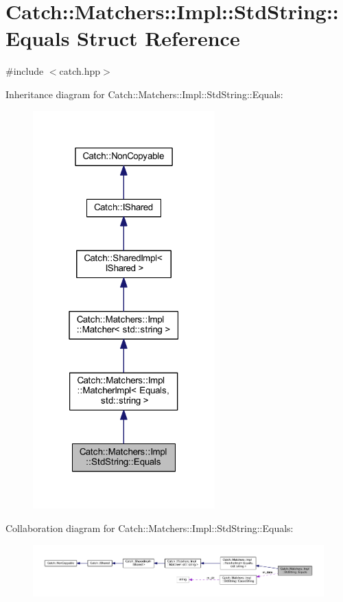 \hypertarget{struct_catch_1_1_matchers_1_1_impl_1_1_std_string_1_1_equals}{}\section{Catch\+:\+:Matchers\+:\+:Impl\+:\+:Std\+String\+:\+:Equals Struct Reference}
\label{struct_catch_1_1_matchers_1_1_impl_1_1_std_string_1_1_equals}


{\ttfamily \#include $<$catch.\+hpp$>$}



Inheritance diagram for Catch\+:\+:Matchers\+:\+:Impl\+:\+:Std\+String\+:\+:Equals\+:\nopagebreak
\begin{figure}[H]
\begin{center}
\leavevmode
\includegraphics[width=199pt]{struct_catch_1_1_matchers_1_1_impl_1_1_std_string_1_1_equals__inherit__graph}
\end{center}
\end{figure}


Collaboration diagram for Catch\+:\+:Matchers\+:\+:Impl\+:\+:Std\+String\+:\+:Equals\+:\nopagebreak
\begin{figure}[H]
\begin{center}
\leavevmode
\includegraphics[width=350pt]{struct_catch_1_1_matchers_1_1_impl_1_1_std_string_1_1_equals__coll__graph}
\end{center}
\end{figure}
